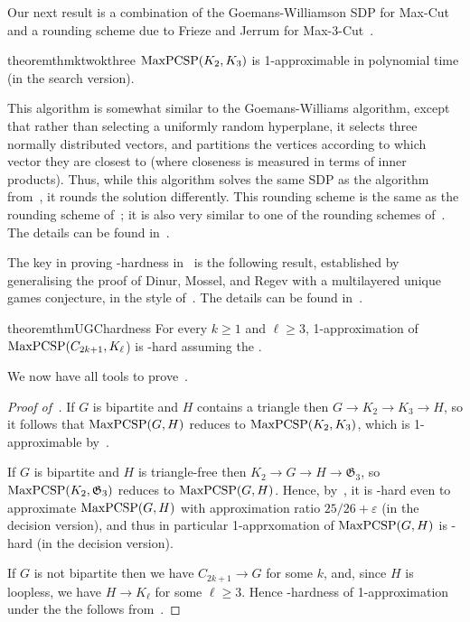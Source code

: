\documentclass[a4paper,11pt, DIV=11]{scrartcl}
\renewcommand{\epsilon}{\varepsilon}
\renewcommand{\G}{\ensuremath{\mathfrak{G}}}
\DeclareMathOperator{\maxPCSP}{\textup{MaxPCSP}}
\theoremstyle{plain}
\theoremstyle{definition}
\begin{document}
\medskip
Our next result is a combination of
the Goemans-Williamson SDP for Max-Cut~\cite{GW95} and a rounding scheme due to Frieze
and Jerrum for Max-3-Cut~\cite{FJ97}.

\begin{restatable}{theorem}{thmktwokthree}\label{thm:k2k3}
$\maxPCSP(K_2, K_3)$ is 1-approximable in polynomial time (in the search version).
\end{restatable}

This algorithm is somewhat similar to the Goemans-Williams algorithm, except
that rather than selecting a uniformly random hyperplane, it selects three
normally distributed vectors, and partitions the vertices according to which
vector they are closest to (where closeness is measured in terms of inner
products). Thus, while this algorithm solves the same SDP as the algorithm
from~, it rounds the solution differently. This rounding scheme is the same as the rounding scheme of~\cite{FJ97}; it is also very similar to one of the rounding schemes of~\cite{Karger98:jacm}. The details can be
found in~.

\medskip

The key in proving \NP-hardness in~ is the following
result, established by generalising the proof of Dinur, Mossel, and
Regev\cite{Dinur09:sicomp} with a multilayered unique games conjecture, in the
style of~\cite{BWZ21}. The details can be found in~.

\begin{restatable}{theorem}{thmUGChardness} \label{thm:ugcHardness}
    For every $k\geq 1$ and $\ell \geq 3$, 1-approximation of $\maxPCSP(C_{2k+1},
    K_\ell$) is \NP-hard assuming the \UGC.
\end{restatable}

We now have all tools to prove~.

\begin{proof}[Proof of~]
    If $G$ is bipartite and $H$ contains a triangle then $G \to K_2 \to K_3 \to
    H$, so it follows that $\maxPCSP(G, H)$  reduces to $\maxPCSP(K_2, K_3)$,
    which is 1-approximable by~. 
    
    If $G$ is bipartite and $H$ is triangle-free then $K_2 \to G \to H \to
    \G_3$, so $\maxPCSP(K_2, \G_3)$ reduces to $\maxPCSP(G, H)$. Hence,
    by~, it is \NP-hard even to approximate $\maxPCSP(G, H)$ with
    approximation ratio $25 / 26 + \epsilon$ (in the decision version), and thus
    in particular 1-apprxomation of $\maxPCSP(G, H)$ is \NP-hard (in the decision version).

    If $G$ is not bipartite then we have $C_{2k + 1} \to G$ for some $k$, and,
    since $H$ is loopless, we have $H \to K_\ell$ for some $\ell \geq 3$. Hence
    \NP-hardness of 1-approximation under the the \UGC{} follows
    from~.
\end{proof}
\end{document}
